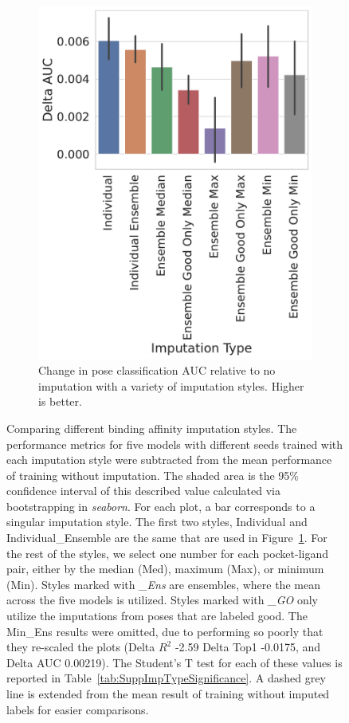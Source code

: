 \documentclass[journal=jcisd8,manuscript=article]{achemso}
\begin{document}
\begin{figure}[tbph]
\begin{subfigure}[t]{0.30\textwidth}
        \includegraphics[width=\linewidth]{figures/ComparingImpStylesAUC.pdf}
        \caption{Change in pose classification AUC relative to no imputation with a variety of imputation styles. Higher is better.}
    \end{subfigure}
    \caption{Comparing different binding affinity imputation styles. The performance metrics for five models with different seeds trained with each imputation style were subtracted from the mean performance of training without imputation. The shaded area is the 95\% confidence interval of this described value calculated via bootstrapping in \textit{seaborn}. For each plot, a bar corresponds to a singular imputation style. The first two styles, Individual and Individual\_Ensemble are the same that are used in Figure~\ref{fig:SuppcompareImp}. For the rest of the styles, we select one number for each pocket-ligand pair, either by the median (Med), maximum (Max), or minimum (Min). Styles marked with \textit{\_Ens} are ensembles, where the mean across the five models is utilized. Styles marked with \textit{\_GO} only utilize the imputations from poses that are labeled good. The Min\_Ens results were omitted, due to performing so poorly that they re-scaled the plots (Delta $R^2$ -2.59 Delta Top1 -0.0175, and Delta AUC 0.00219). The Student's T test for each of these values is reported in Table~\ref{tab:SuppImpTypeSignificance}.  A dashed grey line is extended from the mean result of training without imputed labels for easier comparisons.}
    \label{fig:SuppcompareImp}
\end{figure}
\end{document}
